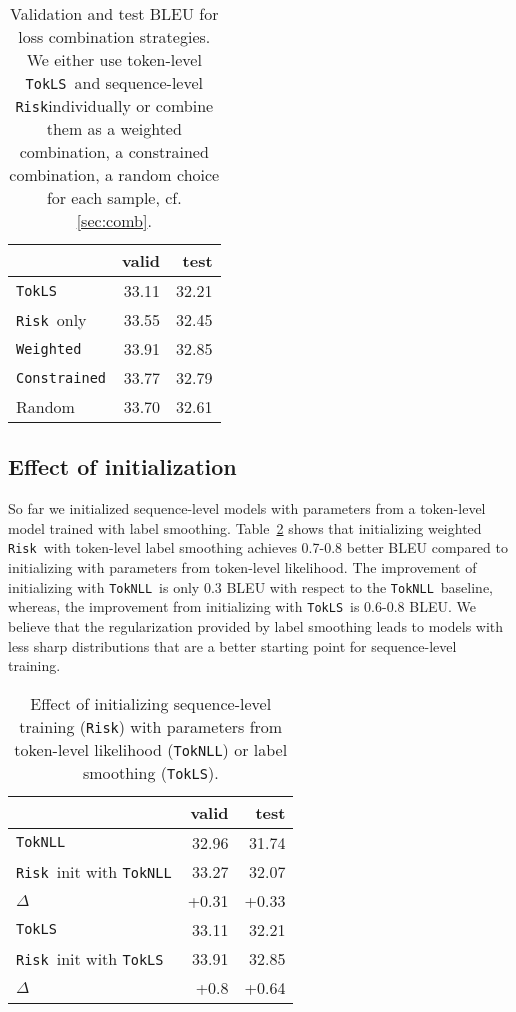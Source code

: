 \documentclass[11pt,a4paper]{article}
\newcommand{\TokNLL}{\texttt{TokNLL}}
\newcommand{\TokLS}{\texttt{TokLS}}
\newcommand{\Risk}{\texttt{Risk}}
\newcommand{\Constrained}{\texttt{Constrained}}
\newcommand{\Weighted}{\texttt{Weighted}}
\begin{document}
\begin{table}[t]
\centering
\begin{tabular}{lrr}
\toprule
& \bf valid & \bf test \\ \midrule
\TokLS & 33.11 & 32.21 \\
\Risk~only & 33.55 & 32.45 \\ \midrule
\Weighted & 33.91 & 32.85 \\
\Constrained & 33.77 & 32.79 \\
Random & 33.70 & 32.61 \\
\bottomrule
\end{tabular}
\caption{Validation and test BLEU for loss combination strategies. We either use token-level
\TokLS~and sequence-level \Risk individually or combine them
as a weighted combination, a constrained combination, a random choice for each sample, cf. \textsection\ref{sec:comb}.
}
\label{tab:combresults}
\end{table}


\subsection{Effect of initialization}
\label{sec:results_init}

So far we initialized sequence-level models with parameters from a token-level model trained with label smoothing. Table~\ref{tab:results_init} shows that initializing weighted \Risk~with token-level label smoothing achieves 0.7-0.8 better BLEU compared to initializing with parameters from token-level likelihood.
The improvement of initializing with \TokNLL~is only 0.3 BLEU with respect to the \TokNLL~baseline, whereas, the improvement from initializing with \TokLS~is 0.6-0.8 BLEU.
We believe that the regularization provided by label smoothing leads to models with less sharp distributions that are a better starting point for sequence-level training.

\begin{table}
\centering
\begin{tabular}{lrr}
\toprule
& \bf valid & \bf test \\ \midrule
\TokNLL & 32.96 & 31.74 \\
\Risk~init with \TokNLL & 33.27 & 32.07 \\
$\Delta$ & +0.31 & +0.33 \\ \midrule
\TokLS & 33.11 & 32.21 \\
\Risk~init with \TokLS & 33.91 & 32.85 \\
$\Delta$ & +0.8 & +0.64 \\
\bottomrule
\end{tabular}
\caption{Effect of initializing sequence-level training (\Risk) with parameters from token-level likelihood (\TokNLL) or label smoothing (\TokLS).
}
\label{tab:results_init}
\end{table}
\end{document}
